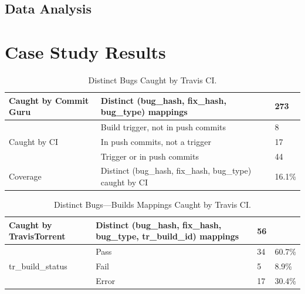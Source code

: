 \documentclass[10pt,conference]{IEEEtran}
\begin{document}
\subsection{Data Analysis}

\section{Case Study Results}

\begin{table}[t]
\centering
\begin{tabular}{lll}
\hline
Caught by Commit Guru         & Distinct (bug\_hash, fix\_hash, bug\_type) mappings     & 273    \\ \hline
\multirow{3}{*}{Caught by CI} & Build trigger, not in push commits                    & 8      \\
                              & In push commits, not a trigger                        & 17     \\
                              & Trigger or in push commits                            & 44     \\ \hline
Coverage                      & Distinct (bug\_hash, fix\_hash, bug\_type) caught by CI & 16.1\% \\ \hline
\end{tabular}
\caption{Distinct Bugs Caught by Travis CI.}
\label{tab:caughtbytravis}
\end{table}

\begin{table}[t]
\centering
\begin{tabular}{llll}
\hline
Caught by TravisTorrent            & Distinct (bug\_hash, fix\_hash, bug\_type, tr\_build\_id) mappings & 56 &        \\ \hline
\multirow{3}{*}{tr\_build\_status} & Pass                                                               & 34 & 60.7\% \\
                                   & Fail                                                               & 5  & 8.9\%  \\
                                   & Error                                                              & 17 & 30.4\% \\ \hline
\end{tabular}
\caption{Distinct Bugs---Builds Mappings Caught by Travis CI. }
\label{tab:buildstatus}
\end{table}

\end{document}
